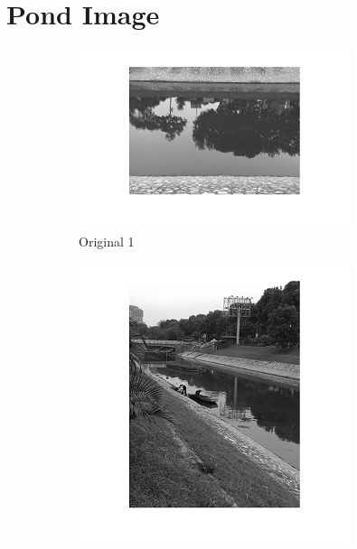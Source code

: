 \section*{Pond Image}
\begin{center}
\begin{figure}[h]
        \begin{subfigure}[b]{0.18\textwidth}
                \includegraphics[width=\linewidth]{pond1.png}
                \caption{Original 1}
                \label{fig:original 1}
        \end{subfigure}%
        \begin{subfigure}[b]{0.18\textwidth}
                \includegraphics[width=\linewidth]{pond2.png}

\end{subfigure}
\end{figure}
\end{center}
